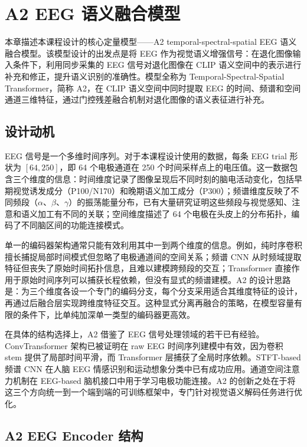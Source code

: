 \section{A2 EEG 语义融合模型}

本章描述本课程设计的核心定量模型——A2 temporal-spectral-spatial EEG 语义融合模型。该模型设计的出发点是将 EEG 作为视觉语义增强信号：在退化图像输入条件下，利用同步采集的 EEG 信号对退化图像在 CLIP 语义空间中的表示进行补充和修正，提升语义识别的准确性。模型全称为 Temporal-Spectral-Spatial Transformer，简称 A2，在 CLIP 语义空间中同时提取 EEG 的时间、频谱和空间通道三维特征，通过门控残差融合机制对退化图像的语义表征进行补充。

\subsection{设计动机}

EEG 信号是一个多维时间序列。对于本课程设计使用的数据，每条 EEG trial 形状为 $[64, 250]$，即 64 个电极通道在 250 个时间采样点上的电压值。这一数据包含三个维度的信息：时间维度记录了图像呈现后不同时刻的脑电活动变化，包括早期视觉诱发成分（P100/N170）和晚期语义加工成分（P300）；频谱维度反映了不同频段（$\alpha$、$\beta$、$\gamma$）的振荡能量分布，已有大量研究证明这些频段与视觉感知、注意和语义加工有不同的关联；空间维度描述了 64 个电极在头皮上的分布拓扑，编码了不同脑区间的功能连接模式。

单一的编码器架构通常只能有效利用其中一到两个维度的信息。例如，纯时序卷积擅长捕捉局部时间模式但忽略了电极通道间的空间关系；频谱 CNN 从时频域提取特征但丧失了原始时间拓扑信息，且难以建模跨频段的交互；Transformer 直接作用于原始时间序列可以捕获长程依赖，但没有显式的频谱建模。A2 的设计思路是：为三个维度各设一个专门的编码分支，每个分支采用适合其维度特征的设计，再通过后融合层实现跨维度特征交互。这种显式分离再融合的策略，在模型容量有限的条件下，比单纯加深单一类型的编码器更高效。

在具体的结构选择上，A2 借鉴了 EEG 信号处理领域的若干已有经验。ConvTransformer 架构已被证明在 raw EEG 时间序列建模中有效，因为卷积 stem 提供了局部时间平滑，而 Transformer 层捕获了全局时序依赖。STFT-based 频谱 CNN 在人脑 EEG 情感识别和运动想象分类中已有成功应用。通道空间注意力机制在 EEG-based 脑机接口中用于学习电极功能连接。A2 的创新之处在于将这三个方向统一到一个端到端的可训练框架中，专门针对视觉语义解码任务进行优化。

\subsection{A2 EEG Encoder 结构}

